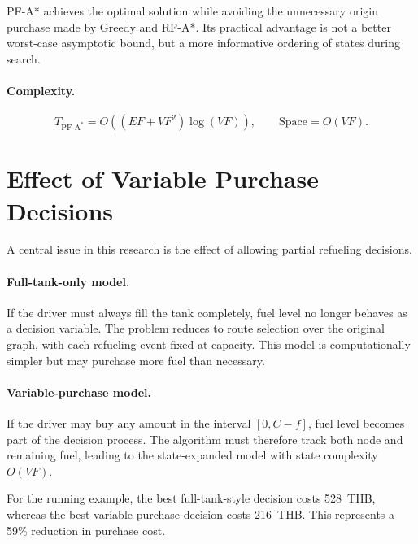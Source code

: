 PF-A* achieves the optimal solution while avoiding the unnecessary origin purchase made by Greedy and RF-A*. Its practical advantage is not a better worst-case asymptotic bound, but a more informative ordering of states during search.

\paragraph{Complexity.}
\[
T_{\mathrm{PF\text{-}A^{*}}}=O\!\left((EF+VF^{2})\log(VF)\right),
\qquad
\text{Space}=O(VF).
\]

\section{Effect of Variable Purchase Decisions}
\label{sec:variable_purchase}

A central issue in this research is the effect of allowing partial refueling decisions.

\paragraph{Full-tank-only model.}
If the driver must always fill the tank completely, fuel level no longer behaves as a decision variable. The problem reduces to route selection over the original graph, with each refueling event fixed at capacity. This model is computationally simpler but may purchase more fuel than necessary.

\paragraph{Variable-purchase model.}
If the driver may buy any amount in the interval $[0,C-f]$, fuel level becomes part of the decision process. The algorithm must therefore track both node and remaining fuel, leading to the state-expanded model with state complexity $O(VF)$.

For the running example, the best full-tank-style decision costs 528~THB, whereas the best variable-purchase decision costs 216~THB. This represents a 59\% reduction in purchase cost.


